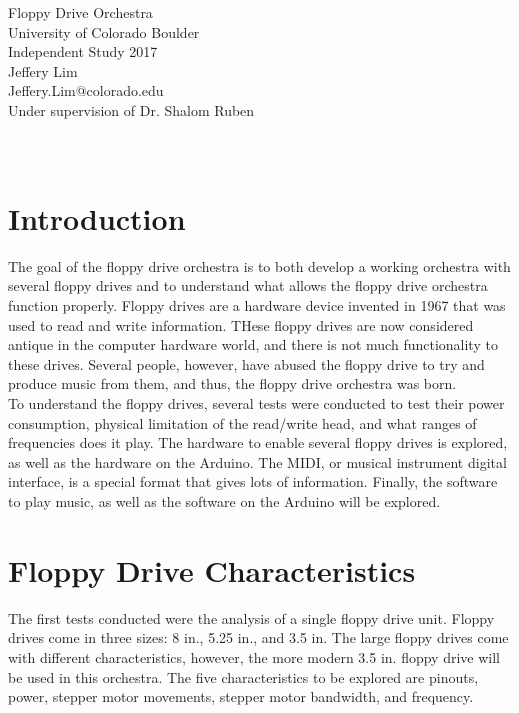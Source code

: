 \documentclass[11pt, a4paper]{report}
\begin{document}
\begin{center}
  \Huge Floppy Drive Orchestra \\
  \huge University of Colorado Boulder \\
  \Large Independent Study 2017\\
  
  \vspace{6in}
    \huge Jeffery Lim \\
    \huge Jeffery.Lim@colorado.edu\\
    \Large Under supervision of Dr. Shalom Ruben \\~\\~\\
\end{center}

\tableofcontents

\chapter{Introduction}

The goal of the floppy drive orchestra is to both develop a working orchestra with several floppy drives and to understand what allows the floppy drive orchestra function properly. Floppy drives are a hardware device invented in 1967 that was used to read and write information. THese floppy drives are now considered antique in the computer hardware world, and there is not much functionality to these drives. Several people, however, have abused the floppy drive to try and produce music from them, and thus, the floppy drive orchestra was born. \\

To understand the floppy drives, several tests were conducted to test their power consumption, physical limitation of the read/write head, and what ranges of frequencies does it play. The hardware to enable several floppy drives is explored, as well as the hardware on the Arduino. The MIDI, or musical instrument digital interface, is a special format that gives lots of information. Finally, the software to play music, as well as the software on the Arduino will be explored. 

\chapter{Floppy Drive Characteristics}

The first tests conducted were the analysis of a single floppy drive unit. Floppy drives come in three sizes: 8 in., 5.25 in., and 3.5 in. The large floppy drives come with different characteristics, however, the more modern 3.5 in. floppy drive will be used in this orchestra. The five characteristics to be explored are pinouts, power, stepper motor movements, stepper motor bandwidth, and frequency.
\end{document}
